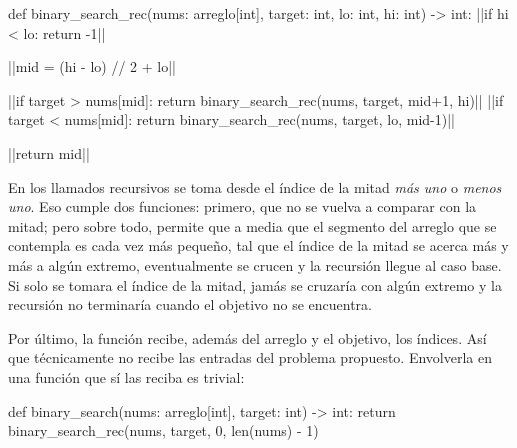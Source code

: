 \begin{codeblock}
\begin{pseudocode}
def binary_search_rec(nums: arreglo[int], target: int, lo: int, hi: int) -> int:
    ||if hi < lo:
        return -1||

    ||mid = (hi - lo) // 2 + lo||

    ||if target > nums[mid]:
        return binary_search_rec(nums, target, mid+1, hi)||
    ||if target < nums[mid]:
        return binary_search_rec(nums, target, lo, mid-1)||

    ||return mid||
\end{pseudocode}
\begin{annotations}
\end{annotations}
\end{codeblock}

En los llamados recursivos se toma desde el índice de la mitad \emph{más uno} o \emph{menos uno}. Eso cumple dos funciones: primero, que no se vuelva a comparar con la mitad; pero sobre todo, permite que a media que el segmento del arreglo que se contempla es cada vez más pequeño, tal que el índice de la mitad se acerca más y más a algún extremo, eventualmente se crucen y la recursión llegue al caso base. Si solo se tomara el índice de la mitad, jamás se cruzaría con algún extremo y la recursión no terminaría cuando el objetivo no se encuentra.

Por último, la función recibe, además del arreglo y el objetivo, los índices. Así que técnicamente no recibe las entradas del problema propuesto. Envolverla en una función que sí las reciba es trivial:
\begin{codeblock}
\begin{pseudocode}
def binary_search(nums: arreglo[int], target: int) -> int:
    return binary_search_rec(nums, target, 0, len(nums) - 1)
\end{pseudocode}
\end{codeblock}


